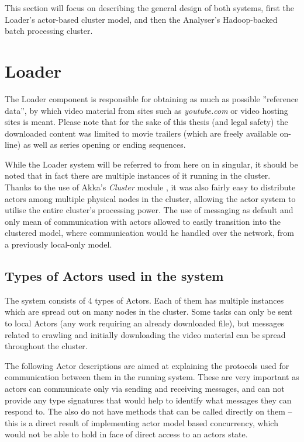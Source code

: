 This section will focus on describing the general design of both systems, first the Loader's actor-based cluster model, and then the Analyser's Hadoop-backed batch processing cluster.

\section{Loader}
\label{sec:loader-basics}
The Loader component is responsible for obtaining as much as possible ''reference data'', by which video material from sites such as \textit{youtube.com} or video hosting sites is meant. Please note that for the sake of this thesis (and legal safety) the downloaded content was limited to movie trailers (which are freely available on-line) as well as series opening or ending sequences.

While the Loader system will be referred to from here on in singular, it should be noted that in fact there are multiple instances of it running in the cluster. Thanks to the use of Akka's \textit{Cluster} module \cite{akka-cluster}, it was also fairly easy to distribute actors among multiple physical nodes in the cluster, allowing the actor system to utilise the entire cluster's processing power. The use of messaging as default and only mean of communication with actors allowed to easily transition into the clustered model, where communication would he handled over the network, from a previously local-only model.

\subsection{Types of Actors used in the system}
\label{sec:types-of-actors}

The system consists of 4 types of Actors. Each of them has multiple instances which are spread out on many nodes in the cluster. Some tasks can only be sent to local Actors (any work requiring an already downloaded file), but messages related to crawling and initially downloading the video material can be spread throughout the cluster. 

The following Actor descriptions are aimed at explaining the protocols used for communication between them in the running system. These are very important as actors can communicate only via sending and receiving messages, and can not provide any type signatures that would help to identify what messages they can respond to. The also do not have methods that can be called directly on them -- this is a direct result of implementing actor model based concurrency, which would not be able to hold in face of direct access to an actors state.

